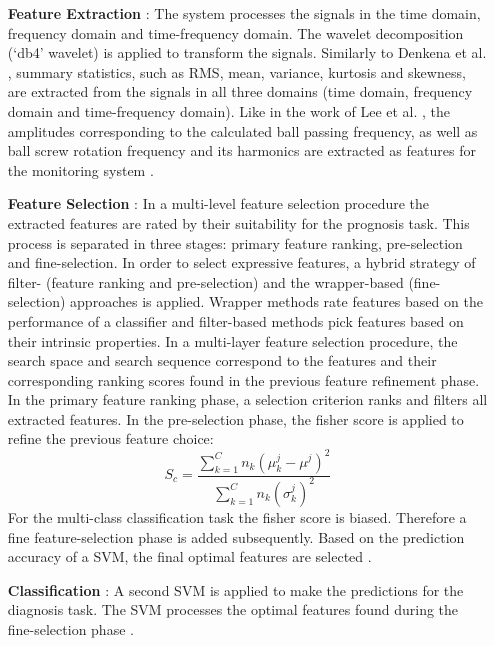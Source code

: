 \begin{itemize}
    \item [\textbf{Feature Extraction}]: The system processes the signals in the time domain, frequency domain and time-frequency domain. The wavelet decomposition (‘db4’ wavelet) is applied to transform the signals. Similarly to Denkena et al. \cite{Denkena2021}, summary statistics, such as RMS, mean, variance, kurtosis and skewness, are extracted from the signals in all three domains (time domain, frequency domain and time-frequency domain). Like in the work of Lee et al. \cite{Lee2015}, the amplitudes corresponding to the calculated ball passing frequency, as well as ball screw rotation frequency and its harmonics are extracted as features for the monitoring system \cite{LiPin2018}.
    \item [\textbf{Feature Selection}]: In a multi-level feature selection procedure the extracted features are rated by their suitability for the prognosis task. This process is separated in three stages: primary feature ranking, pre-selection and fine-selection. In order to select expressive features, a hybrid strategy of filter- (feature ranking and pre-selection) and the wrapper-based (fine-selection) approaches is applied. Wrapper methods rate features based on the performance of a classifier and filter-based methods pick features based on their intrinsic properties. In a multi-layer feature selection procedure, the search space and search sequence correspond to the features and their corresponding ranking scores found in the previous feature refinement phase. In the primary feature ranking phase, a selection criterion ranks and filters all extracted features. In the pre-selection phase, the fisher score is applied to refine the previous feature choice:
    \begin{equation}
        S_{c} = \frac{\sum_{k=1}^{C} n_{k}(\mu_{k}^{j}-\mu^{j})^{2}}{\sum_{k=1}^{C}n_{k}(\sigma_{k}^{j})^{2}}
    \end{equation}
    For the multi-class classification task the fisher score is biased. Therefore a fine feature-selection phase is added subsequently. Based on the prediction accuracy of a SVM, the final optimal features are selected \cite{LiPin2018}.
    \item [\textbf{Classification}]: A second SVM is applied to make the predictions for the diagnosis task. The SVM processes the optimal features found during the fine-selection phase \cite{LiPin2018}. 
\end{itemize}

